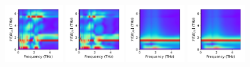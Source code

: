 \documentclass[a4paper]{article}
\begin{document}
\begin{figure}[H]
  \centering
  \includegraphics[width=0.23\textwidth]{cond_w_pcolor-A2-v5-imp0.pdf}
  \includegraphics[width=0.23\textwidth]{cond_w_pcolor-A2-v5-imp1.pdf}
  \includegraphics[width=0.23\textwidth]{cond_w_pcolor-A2-v5-imp2.pdf}
  \includegraphics[width=0.23\textwidth]{cond_w_pcolor-A2-v5-imp3.pdf}
\end{figure}

\newpage
\end{document}
